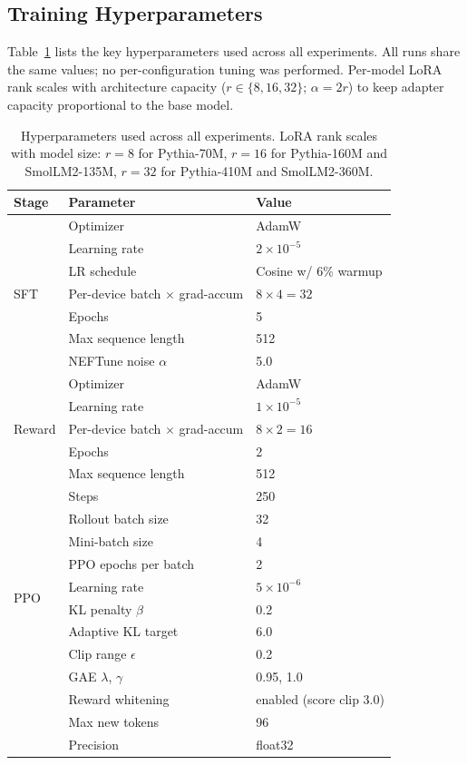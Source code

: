 \documentclass[10pt,twocolumn,letterpaper]{article}
\begin{document}
\subsection{Training Hyperparameters}

Table~\ref{tab:hparams} lists the key hyperparameters used across all experiments. All runs share the same values; no per-configuration tuning was performed. Per-model LoRA rank scales with architecture capacity ($r\in\{8,16,32\}$; $\alpha=2r$) to keep adapter capacity proportional to the base model.

\begin{table}[h]
\centering
\caption{Hyperparameters used across all experiments. LoRA rank scales with model size: $r=8$ for Pythia-70M, $r=16$ for Pythia-160M and SmolLM2-135M, $r=32$ for Pythia-410M and SmolLM2-360M.}
\label{tab:hparams}
\small
\begin{tabular}{lll}
\toprule
\textbf{Stage} & \textbf{Parameter} & \textbf{Value} \\
\midrule
\multirow{7}{*}{SFT}
  & Optimizer & AdamW~\cite{loshchilov2019decoupled} \\
  & Learning rate & $2\times10^{-5}$ \\
  & LR schedule & Cosine w/ 6\% warmup \\
  & Per-device batch $\times$ grad-accum & $8\times 4=32$ \\
  & Epochs & 5 \\
  & Max sequence length & 512 \\
  & NEFTune noise $\alpha$~\cite{jiang2023neftune} & 5.0 \\
\midrule
\multirow{5}{*}{Reward}
  & Optimizer & AdamW \\
  & Learning rate & $1\times10^{-5}$ \\
  & Per-device batch $\times$ grad-accum & $8\times 2=16$ \\
  & Epochs & 2 \\
  & Max sequence length & 512 \\
\midrule
\multirow{10}{*}{PPO}
  & Steps & 250 \\
  & Rollout batch size & 32 \\
  & Mini-batch size & 4 \\
  & PPO epochs per batch & 2 \\
  & Learning rate & $5\times 10^{-6}$ \\
  & KL penalty $\beta$ & 0.2 \\
  & Adaptive KL target & 6.0 \\
  & Clip range $\epsilon$ & 0.2 \\
  & GAE $\lambda$, $\gamma$ & 0.95, 1.0 \\
  & Reward whitening & enabled (score clip 3.0) \\
  & Max new tokens & 96 \\
  & Precision & float32 \\
\bottomrule
\end{tabular}
\end{table}
\end{document}
